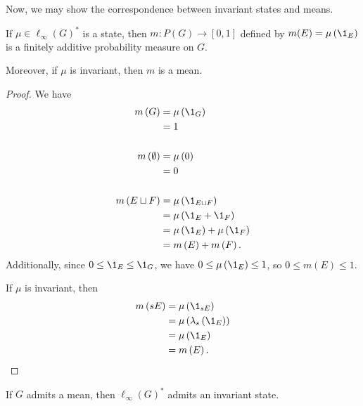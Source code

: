 \documentclass[10pt]{mypackage2}
\begin{document}
Now, we may show the correspondence between invariant states and means.
\begin{proposition}\label{prop:state_implies_mean}
  If $\mu\in \ell_{\infty}\left(G\right)^{\ast}$ is a state, then $m\colon P(G)\rightarrow [0,1]$ defined by $m(E) = \mu\left(\1_{E}\right)$ is a finitely additive probability measure on $G$.\newline

  Moreover, if $\mu$ is invariant, then $m$ is a mean.
\end{proposition}
\begin{proof}
  We have
  \begin{align*}
    m\left(G\right) &= \mu\left(\1_{G}\right)\\
                    &= 1\\
                    \\
    m\left(\emptyset\right) &= \mu\left(0\right)\\
                            &= 0\\
                            \\
    m\left(E\sqcup F\right) &= \mu\left(\1_{E\sqcup F}\right)\\
                            &= \mu\left(\1_{E} + \1_{F}\right)\\
                            &= \mu\left(\1_{E}\right) + \mu\left(\1_{F}\right)\\
                            &= m\left(E\right) + m\left(F\right).
  \end{align*}
  Additionally, since $0 \leq \1_{E}\leq \1_{G}$, we have $0 \leq \mu\left(\1_{E}\right) \leq 1$, so $0 \leq m(E) \leq 1$.\newline

  If $\mu$ is invariant, then
  \begin{align*}
    m\left(sE\right) &= \mu\left(\1_{sE}\right)\\
                     &= \mu\left(\lambda_s\left(\1_{E}\right)\right)\\
                     &= \mu\left(\1_{E}\right)\\
                     &= m\left(E\right).
  \end{align*}
\end{proof}
\begin{proposition}\label{prop:mean_implies_state}
  If $G$ admits a mean, then $\ell_{\infty}\left(G\right)^{\ast}$ admits an invariant state.
\end{proposition}
\end{document}
